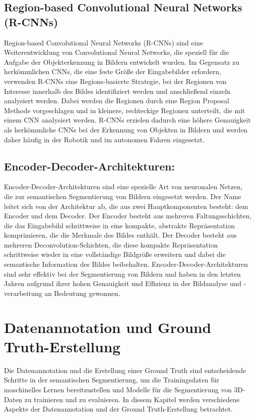 \subsection{Region-based Convolutional Neural Networks (R-CNNs)}
Region-based Convolutional Neural Networks (R-CNNs) sind eine Weiterentwicklung
von Convolutional Neural Networks, die speziell für die Aufgabe der
Objekterkennung in Bildern entwickelt wurden. Im Gegensatz zu herkömmlichen
CNNs, die eine feste Größe der Eingabebilder erfordern, verwenden R-CNNs eine
Regions-basierte Strategie, bei der Regionen von Interesse innerhalb des Bildes
identifiziert werden und anschließend einzeln analysiert werden. Dabei werden
die Regionen durch eine Region Proposal Methode vorgeschlagen und in kleinere,
rechteckige Regionen unterteilt, die mit einem CNN analysiert werden. R-CNNs
erzielen dadurch eine höhere Genauigkeit als herkömmliche CNNs bei der
Erkennung von Objekten in Bildern und werden daher häufig in der Robotik und im
autonomen Fahren eingesetzt.
\subsection{Encoder-Decoder-Architekturen:}

Encoder-Decoder-Architekturen sind eine spezielle Art von neuronalen Netzen,
die zur semantischen Segmentierung von Bildern eingesetzt werden. Der Name
leitet sich von der Architektur ab, die aus zwei Hauptkomponenten besteht: dem
Encoder und dem Decoder. Der Encoder besteht aus mehreren Faltungsschichten,
die das Eingabebild schrittweise in eine kompakte, abstrakte Repräsentation
komprimieren, die die Merkmale des Bildes enthält. Der Decoder besteht aus
mehreren Deconvolution-Schichten, die diese kompakte Repräsentation
schrittweise wieder in eine vollständige Bildgröße erweitern und dabei die
semantische Information des Bildes beibehalten. Encoder-Decoder-Architekturen
sind sehr effektiv bei der Segmentierung von Bildern und haben in den letzten
Jahren aufgrund ihrer hohen Genauigkeit und Effizienz in der Bildanalyse und
-verarbeitung an Bedeutung gewonnen.
\section{Datenannotation und Ground Truth-Erstellung}

Die Datenannotation und die Erstellung einer Ground Truth sind entscheidende
Schritte in der semantischen Segmentierung, um die Trainingsdaten für
maschinelles Lernen bereitzustellen und Modelle für die Segmentierung von
3D-Daten zu trainieren und zu evaluieren. In diesem Kapitel werden verschiedene
Aspekte der Datenannotation und der Ground Truth-Erstellung betrachtet.

